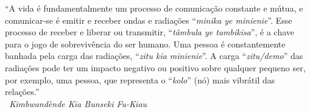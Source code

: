 
\begin{epigrafe}

{``A vida é fundamentalmente um processo de comunicação constante e mútua, e comunicar-se é emitir e receber ondas e radiações “\textit{minika ye
minienie}”. Esse processo de receber e liberar ou transmitir, “\textit{tâmbula ye tambikisa}”, é a chave para o jogo de sobrevivência do ser humano. Uma pessoa é constantemente banhada pela carga das radiações, “\textit{zitu kia minienie}”. A carga “\textit{zitu/demo}” das radiações pode ter um impacto negativo ou positivo sobre qualquer pequeno ser, por exemplo, uma pessoa, que representa o “\textit{kolo}” (nó) mais vibrátil das relações.” \\
\textit{\textemdash \  Kimbwandènde Kia Bunseki Fu-Kiau}}

\end{epigrafe}
